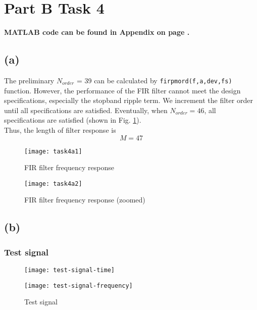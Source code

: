 \documentclass{article}
\newenvironment{homeworkProblem}[1]{
	\section*{#1}
	}{
}
\newenvironment{homeworkSection}[1]{
	\subsection*{#1}
	}{
}
\begin{document}

\begin{homeworkProblem}{Part B Task 4}

\textbf{MATLAB code can be found in Appendix on page \pageref{task4_code}.}


\begin{homeworkSection}{(a)}

The preliminary $N_{order}$ = 39 can be calculated by \texttt{firpmord(f,a,dev,fs)} function. However, the performance of the FIR filter cannot meet the design specifications, especially the stopband ripple term. We increment the filter order until all specifications are satisfied. Eventually, when \textbf{$N_{order} = 46$}, all specifications are satisfied (shown in Fig. \ref{task4a2}).\\

Thus, the length of filter response is
\begin{equation}
M = 47
\end{equation}

\begin{figure}[H]
\begin{minipage}[t]{0.5\linewidth}
\centering
\texttt{[image: task4a1]}
\caption{FIR filter frequency response}
\label{task4a1}
\end{minipage}
\begin{minipage}[t]{0.5\linewidth}
\centering
\texttt{[image: task4a2]}
\caption{FIR filter frequency response (zoomed)}
\label{task4a2}
\end{minipage}
\end{figure}

\end{homeworkSection}


\begin{homeworkSection}{(b)}

\subsubsection*{Test signal}
\begin{figure}[H]
\begin{minipage}[t]{0.5\linewidth}
\centering
\texttt{[image: test-signal-time]}
\end{minipage}
\begin{minipage}[t]{0.5\linewidth}
\centering
\texttt{[image: test-signal-frequency]}
\end{minipage}
\caption{Test signal}
\label{test-signal}
\end{figure}


\end{homeworkSection}
\end{homeworkProblem}
\end{document}
